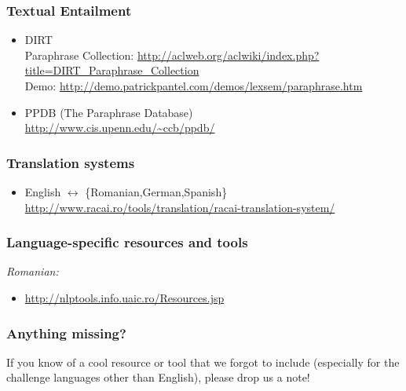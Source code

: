\subsubsection*{Textual Entailment}

\begin{itemize}
\item DIRT \\
      Paraphrase Collection: \url{http://aclweb.org/aclwiki/index.php?title=DIRT_Paraphrase_Collection} \\
      Demo: \url{http://demo.patrickpantel.com/demos/lexsem/paraphrase.htm}
\item PPDB (The Paraphrase Database) \\
      \url{http://www.cis.upenn.edu/~ccb/ppdb/}      
\end{itemize}

\subsubsection*{Translation systems}

\begin{itemize}
\item English $\leftrightarrow$ \{Romanian,German,Spanish\} \\
\url{http://www.racai.ro/tools/translation/racai-translation-system/}
\end{itemize}


\subsubsection*{Language-specific resources and tools}

\emph{Romanian:}
\begin{itemize} 
\item \url{http://nlptools.info.uaic.ro/Resources.jsp}
\end{itemize}


\subsubsection*{Anything missing?} 

If you know of a cool resource or tool that we forgot to include (especially for the challenge languages other than English), 
please drop us a note! 

